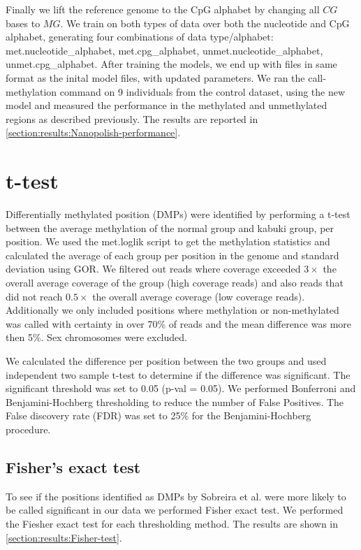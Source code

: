 \begin {table}
\begin{subtable}{1\linewidth}
\begin{tabular}{ l l l l l l l }
             \hline
        \end{tabular}
    \label{table:modelfiles-nucleotide}
    \end{subtable}
\end{table}


Finally we lift the reference genome to the CpG alphabet by changing all $CG$ bases to $MG$. We train on both types of data over both the nucleotide and CpG alphabet, generating four combinations of data type/alphabet: met.nucleotide\_alphabet, met.cpg\_alphabet, unmet.nucleotide\_alphabet, unmet.cpg\_alphabet. After training the models, we end up with files in same format as the inital model files, with updated parameters. We ran the call-methylation command on 9 individuals from the control dataset, using the new model and measured the performance in the methylated and unmethylated regions as described previously. The results are reported in \ref{section:results:Nanopolish-performance}.

\section{t-test}
\label{section:method:t-test}
Differentially methylated position (DMPs) were identified by performing a t-test between the average methylation of the normal group and kabuki group, per position. We used the met.loglik script to get the methylation statistics and calculated the average of each group per position in the genome and standard deviation using GOR.
We filtered out reads where coverage exceeded $3\times$ the overall average coverage of the group (high coverage reads) and also reads that did not reach $0.5\times$ the overall average coverage (low coverage reads). 
Additionally we only included positions where methylation or non-methylated was called with certainty in over 70\% of reads and the mean difference was more then 5\%. Sex chromosomes  were excluded.

We calculated the difference per position between the two groups and used independent two sample t-test to determine if the difference was significant. The significant threshold was set to 0.05 (p-val = 0.05). We performed Bonferroni and Benjamini-Hochberg thresholding to reduce the number of False Positives. The False discovery rate (FDR) was set to 25\% for the Benjamini-Hochberg procedure. 
 
 \subsection{Fisher's exact test}
 To see if the positions identified as DMPs by Sobreira et al. \cite{sobreira2017patients} were more likely to be called significant in our data we performed Fisher exact test. We performed the Fiesher exact test for each thresholding method. The results are shown in \ref{section:results:Fisher-test}.


